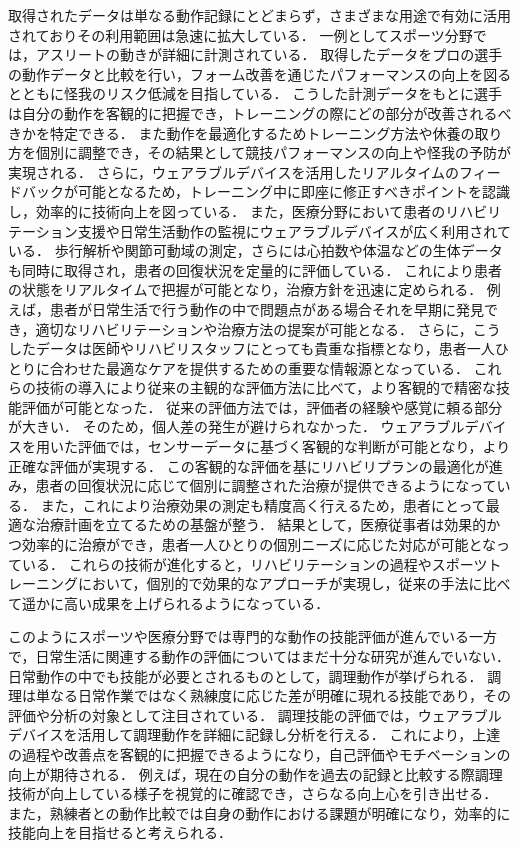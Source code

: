 取得されたデータは単なる動作記録にとどまらず，さまざまな用途で有効に活用されておりその利用範囲は急速に拡大している．
一例としてスポーツ分野では，アスリートの動きが詳細に計測されている\cite{アスリートの動きをリアルタイムに数値化する3Dセンシング技術}．
取得したデータをプロの選手の動作データと比較を行い，フォーム改善を通じたパフォーマンスの向上を図るとともに怪我のリスク低減を目指している．
こうした計測データをもとに選手は自分の動作を客観的に把握でき，トレーニングの際にどの部分が改善されるべきかを特定できる．
また動作を最適化するためトレーニング方法や休養の取り方を個別に調整でき，その結果として競技パフォーマンスの向上や怪我の予防が実現される．
さらに，ウェアラブルデバイスを活用したリアルタイムのフィードバックが可能となるため，トレーニング中に即座に修正すべきポイントを認識し，効率的に技術向上を図っている．
また，医療分野において患者のリハビリテーション支援や日常生活動作の監視にウェアラブルデバイスが広く利用されている\cite{リハビリテーション医療における転倒予防}．
歩行解析や関節可動域の測定，さらには心拍数や体温などの生体データも同時に取得され，患者の回復状況を定量的に評価している．
これにより患者の状態をリアルタイムで把握が可能となり，治療方針を迅速に定められる．
例えば，患者が日常生活で行う動作の中で問題点がある場合それを早期に発見でき，適切なリハビリテーションや治療方法の提案が可能となる．
さらに，こうしたデータは医師やリハビリスタッフにとっても貴重な指標となり，患者一人ひとりに合わせた最適なケアを提供するための重要な情報源となっている．
これらの技術の導入により従来の主観的な評価方法に比べて，より客観的で精密な技能評価が可能となった．
従来の評価方法では，評価者の経験や感覚に頼る部分が大きい．
そのため，個人差の発生が避けられなかった．
ウェアラブルデバイスを用いた評価では，センサーデータに基づく客観的な判断が可能となり，より正確な評価が実現する．
この客観的な評価を基にリハビリプランの最適化が進み，患者の回復状況に応じて個別に調整された治療が提供できるようになっている．
また，これにより治療効果の測定も精度高く行えるため，患者にとって最適な治療計画を立てるための基盤が整う．
結果として，医療従事者は効果的かつ効率的に治療ができ，患者一人ひとりの個別ニーズに応じた対応が可能となっている．
これらの技術が進化すると，リハビリテーションの過程やスポーツトレーニングにおいて，個別的で効果的なアプローチが実現し，従来の手法に比べて遥かに高い成果を上げられるようになっている．

このようにスポーツや医療分野では専門的な動作の技能評価が進んでいる一方で，日常生活に関連する動作の評価についてはまだ十分な研究が進んでいない．
日常動作の中でも技能が必要とされるものとして，調理動作が挙げられる．
調理は単なる日常作業ではなく熟練度に応じた差が明確に現れる技能であり，その評価や分析の対象として注目されている．
調理技能の評価では，ウェアラブルデバイスを活用して調理動作を詳細に記録し分析を行える．
これにより，上達の過程や改善点を客観的に把握できるようになり，自己評価やモチベーションの向上が期待される．
例えば，現在の自分の動作を過去の記録と比較する際調理技術が向上している様子を視覚的に確認でき，さらなる向上心を引き出せる．
また，熟練者との動作比較では自身の動作における課題が明確になり，効率的に技能向上を目指せると考えられる．

